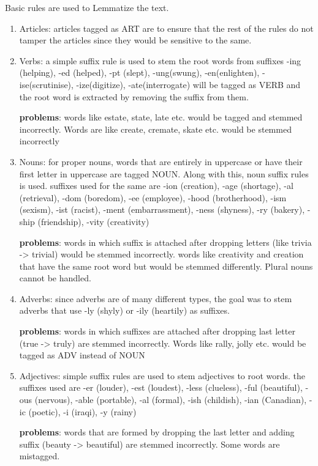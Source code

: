 \documentclass{article}
\begin{document}
Basic rules are used to Lemmatize the text. 
\begin{enumerate}
    \item Articles: articles tagged as ART are to ensure that the rest of the rules do not tamper the articles since they would be sensitive to the same. 
    \item Verbs: a simple suffix rule is used to stem the root words from suffixes -ing (helping), -ed (helped), -pt (slept), -ung(swung), -en(enlighten), -ise(scrutinise), -ize(digitize), -ate(interrogate) will be tagged as VERB and the root word is extracted by removing the suffix from them. 
    
    \textbf{problems}: words like estate, state, late etc. would be tagged and stemmed incorrectly. Words are like create, cremate, skate etc. would be stemmed incorrectly
    \item Nouns: for proper nouns, words that are entirely in uppercase or have their first letter in uppercase are tagged NOUN. Along with this, noun suffix rules is used. suffixes used for the same are -ion (creation), -age (shortage), -al (retrieval), -dom (boredom), -ee (employee), -hood (brotherhood), -ism (sexism), -ist (racist), -ment (embarrassment), -ness (shyness), -ry (bakery), -ship (friendship), -vity (creativity)
    
    \textbf{problems}: words in which suffix is attached after dropping letters (like trivia -> trivial) would be stemmed incorrectly. words like creativity and creation that have the same root word but would be stemmed differently. Plural nouns cannot be handled.
    \item Adverbs: since adverbs are of many different types, the goal was to stem adverbs that use -ly (shyly) or -ily (heartily) as suffixes.

    \textbf{problems}: words in which suffixes are attached after dropping last letter (true -> truly) are stemmed incorrectly. Words like rally, jolly etc. would be tagged as ADV instead of NOUN
    \item Adjectives: simple suffix rules are used to stem adjectives to root words. the suffixes used are -er (louder), -est (loudest), -less (clueless), -ful (beautiful), -ous (nervous), -able (portable), -al (formal), -ish (childish), -ian (Canadian), -ic (poetic), -i (iraqi), -y (rainy) 

    \textbf{problems}: words that are formed by dropping the last letter and adding suffix (beauty -> beautiful) are stemmed incorrectly. Some words are mistagged.
\end{enumerate}
\end{document}

